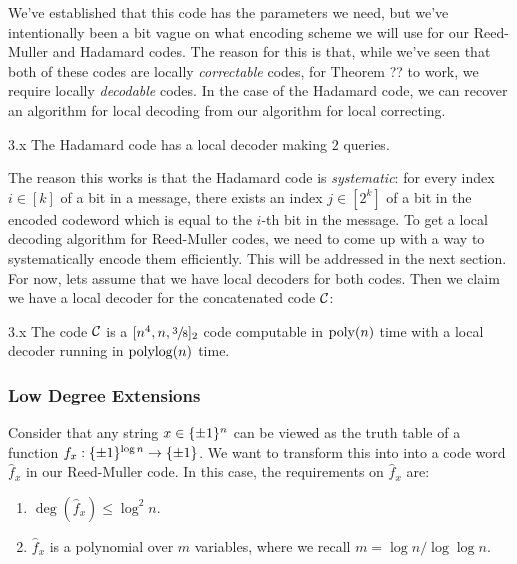 \documentclass[11pt]{article}
\begin{document}
We've established that this code has the parameters we need, but we've intentionally been a bit vague on what encoding scheme we will use for our Reed-Muller and Hadamard codes. The reason for this is that, while we've seen that both of these codes are locally \emph{correctable} codes, for Theorem ?? to work, we require locally \emph{decodable} codes. In the case of the Hadamard code, we can recover an algorithm for local decoding from our algorithm for local correcting.

\begin{claim}{3.x}
    The Hadamard code has a local decoder making $2$ queries.
\end{claim}

The reason this works is that the Hadamard code is \emph{systematic}: for every index $i \in [k]$ of a bit in a message, there exists an index $j \in [2^k]$ of a bit in the encoded codeword which is equal to the $i$-th bit in the message. To get a local decoding algorithm for Reed-Muller codes, we need to come up with a way to systematically encode them efficiently. This will be addressed in the next section. For now, lets assume that we have local decoders for both codes. Then we claim we have a local decoder for the concatenated code $\mathcal{C}$:

\begin{claim}{3.x}
    The code $\mathcal{C}$ is a $[n^4, n, \sfrac{3}{8}]_2$ code computable in $\mathrm{poly}(n)$ time with a local decoder running in $\mathrm{polylog}(n)$ time.
\end{claim}

\subsubsection{Low Degree Extensions}

Consider that any string $x \in \{\pm 1\}^n$ can be viewed as the truth table of a function $f_x : \{\pm 1\}^{\log n} \rightarrow \{\pm 1\}$. We want to transform this into into a code word $\hat{f}_x$ in our Reed-Muller code. In this case, the requirements on $\hat{f}_x$ are:
\begin{enumerate}
    \item $\deg(\hat{f}_x) \leq \log^2 n$.
    \item $\hat{f}_x$ is a polynomial over $m$ variables, where we recall $m = \log n / \log \log n$.
\end{enumerate}
\end{document}
